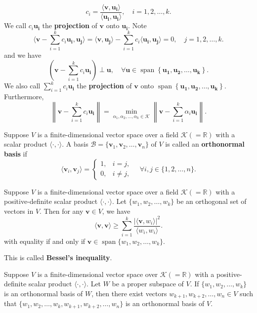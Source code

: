 \begin{propositionenv}
\begin{enumerate}
			\[
			c_i = \frac{\langle \bm{v}, \bm{u_i} \rangle}{\langle \bm{u_i}, \bm{u_i} \rangle}, \quad i=1,2,\ldots,k.
			\]
			We call $c_i \bm{u_i}$ the \textbf{projection} of $\bm{v}$ onto $\bm{u_i}$. Note
			\[
			\langle \bm{v} - \sum_{i=1}^k c_i \bm{u_i}, \bm{u_j} \rangle = \langle \bm{v}, \bm{u_j} \rangle - \sum_{i=1}^k c_i \langle \bm{u_i}, \bm{u_j} \rangle = 0, \quad j=1,2,\ldots,k.
			\]
			and we have
			\[
			\left( \bm{v}- \sum_{i=1}^k c_i \bm{u_i} \right) \perp \bm{u}, \quad \forall \bm{u}\in \operatorname{span}\left\{ \bm{u_1}, \bm{u_2}, \ldots, \bm{u_k} \right\}.
			\]
			We also call $\sum\limits_{i=1}^k c_i \bm{u_i}$ the \textbf{projection} of $\bm{v}$ onto $\operatorname{span}\left\{ \bm{u_1}, \bm{u_2}, \ldots, \bm{u_k} \right\}$.
			Furthermore,
			\[
			\left\| \bm{v} - \sum_{i=1}^k c_i \bm{u_i} \right\| = \min_{\alpha_1, \alpha_2, \ldots, \alpha_k \in \mathcal{K}} \left\| \bm{v} - \sum_{i=1}^k \alpha_i \bm{u_i} \right\|.
			\]
		\end{enumerate}
	\end{propositionenv}
	\begin{definitionenv}
		Suppose $V$ is a finite-dimensional vector space over a field $\mathcal{K}\left( = \mathbb{R} \right)$ with a scalar product $\langle \cdot, \cdot \rangle$. A basis $\mathcal{B} = \{\bm{v}_1, \bm{v}_2, \dots, \bm{v}_n\}$ of $V$ is called an \textbf{orthonormal basis} if
		\[
		\langle \bm{v}_i, \bm{v}_j \rangle =
		\begin{cases}
		1, & i = j, \\
		0, & i \neq j,
		\end{cases}
		\quad \forall i,j \in \{1,2,\ldots,n\}.
		\]
	\end{definitionenv}
	\begin{theoremenv}
		Suppose $V$ is a finite-dimensional vector space over a field $\mathcal{K}\left( = \mathbb{R} \right)$ with a positive-definite scalar product $\langle \cdot, \cdot \rangle$. Let $\{w_1, w_2, \ldots, w_k\}$ be an orthogonal set of vectors in $V$. Then for any $\bm{v} \in V$, we have
		\[
		\langle \bm{v}, \bm{v} \rangle \geq \sum_{i=1}^k \frac{|\langle \bm{v}, w_i \rangle|^2}{\langle w_i, w_i \rangle}.
		\]
		with equality if and only if $\bm{v} \in \operatorname{span}\{w_1, w_2, \ldots, w_k\}$.

		This is called \textbf{Bessel's inequality}.
	\end{theoremenv}
	\begin{lemmaenv}
		Suppose $V$ is a finite-dimensional vector space over $\mathcal{K}\left( = \mathbb{R} \right)$ with a positive-definite scalar product $\langle \cdot, \cdot \rangle$. Let $W$ be a proper subspace of $V$. If $\{w_1, w_2, \ldots, w_k\}$ is an orthonormal basis of $W$, then there exist vectors $w_{k+1}, w_{k+2}, \ldots, w_n \in V$ such that $\{w_1, w_2, \ldots, w_k, w_{k+1}, w_{k+2}, \ldots, w_n\}$ is an orthonormal basis of $V$.
	\end{lemmaenv}
